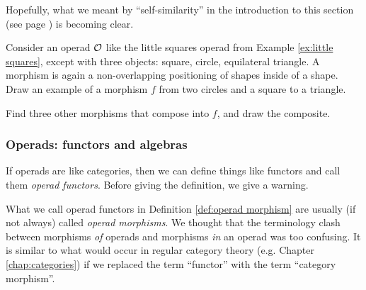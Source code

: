 \begin{example}
Hopefully, what we meant by “self-similarity” in the introduction to this section (see page \pageref{sec:operad}) is becoming clear.

\end{example}

\begin{exercise}\label{exc:little shapes}
Consider an operad $\mathcal{O}$ like the little squares operad from Example \ref{ex:little squares}, except with three objects: square, circle, equilateral triangle. A morphism is again a non-overlapping positioning of shapes inside of a shape. 
\sexc Draw an example of a morphism $f$ from two circles and a square to a triangle.
\item Find three other morphisms that compose into $f$, and draw the composite.
\endsexc
\end{exercise}


\subsubsection{Operads: functors and algebras}

If operads are like categories, then we can define things like functors and call them {\em operad functors}. Before giving the definition, we give a warning.

\begin{warning}

What we call operad functors in Definition \ref{def:operad morphism} are usually (if not always) called {\em operad morphisms}. We thought that the terminology clash between morphisms {\em of} operads and morphisms {\em in} an operad was too confusing. It is similar to what would occur in regular category theory (e.g. Chapter \ref{chap:categories}) if we replaced the term “functor” with the term “category morphism”. 

\end{warning}

